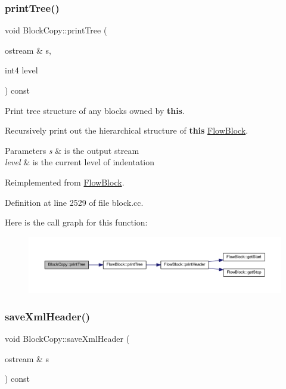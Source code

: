 \subsubsection{\texorpdfstring{printTree()}{printTree()}}
{\footnotesize\ttfamily void Block\+Copy\+::print\+Tree (\begin{DoxyParamCaption}\item[{ostream \&}]{s,  }\item[{int4}]{level }\end{DoxyParamCaption}) const\hspace{0.3cm}{\ttfamily [virtual]}}



Print tree structure of any blocks owned by {\bfseries{this}}. 

Recursively print out the hierarchical structure of {\bfseries{this}} \mbox{\hyperlink{class_flow_block}{Flow\+Block}}. 
\begin{DoxyParams}{Parameters}
{\em s} & is the output stream \\
\hline
{\em level} & is the current level of indentation \\
\hline
\end{DoxyParams}


Reimplemented from \mbox{\hyperlink{class_flow_block_ae00f14fc1916599ec34074fbb010c74b}{Flow\+Block}}.



Definition at line 2529 of file block.\+cc.

Here is the call graph for this function\+:
\nopagebreak
\begin{figure}[H]
\begin{center}
\leavevmode
\includegraphics[width=350pt]{class_block_copy_ac44129ef866b5e09769f7962c1da928c_cgraph}
\end{center}
\end{figure}
\mbox{\label{class_block_copy_a67aa0188bb62e91052092088eeec70ed}} 
\subsubsection{\texorpdfstring{saveXmlHeader()}{saveXmlHeader()}}
{\footnotesize\ttfamily void Block\+Copy\+::save\+Xml\+Header (\begin{DoxyParamCaption}\item[{ostream \&}]{s }\end{DoxyParamCaption}) const\hspace{0.3cm}{\ttfamily [virtual]}}



